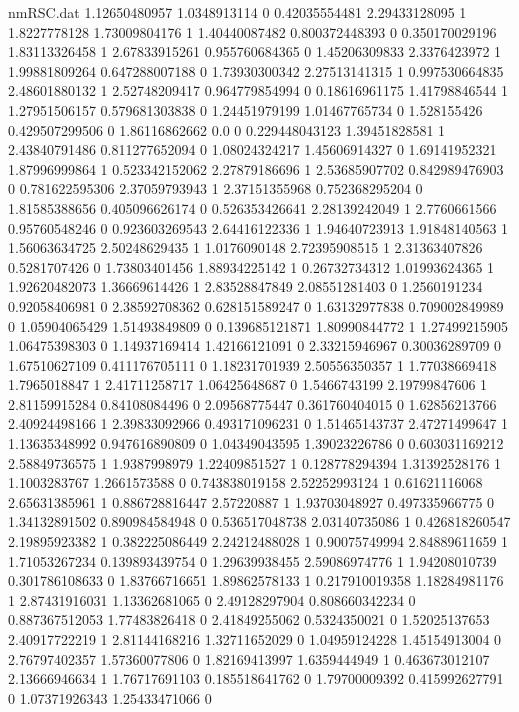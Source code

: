 \begin{filecontents}{nmRSC.dat}
1.12650480957 1.0348913114 0
0.42035554481 2.29433128095 1
1.8227778128 1.73009804176 1
1.40440087482 0.800372448393 0
0.350170029196 1.83113326458 1
2.67833915261 0.955760684365 0
1.45206309833 2.3376423972 1
1.99881809264 0.647288007188 0
1.73930300342 2.27513141315 1
0.997530664835 2.48601880132 1
2.52748209417 0.964779854994 0
0.18616961175 1.41798846544 1
1.27951506157 0.579681303838 0
1.24451979199 1.01467765734 0
1.528155426 0.429507299506 0
1.86116862662 0.0 0
0.229448043123 1.39451828581 1
2.43840791486 0.811277652094 0
1.08024324217 1.45606914327 0
1.69141952321 1.87996999864 1
0.523342152062 2.27879186696 1
2.53685907702 0.842989476903 0
0.781622595306 2.37059793943 1
2.37151355968 0.752368295204 0
1.81585388656 0.405096626174 0
0.526353426641 2.28139242049 1
2.7760661566 0.95760548246 0
0.923603269543 2.64416122336 1
1.94640723913 1.91848140563 1
1.56063634725 2.50248629435 1
1.0176090148 2.72395908515 1
2.31363407826 0.5281707426 0
1.73803401456 1.88934225142 1
0.26732734312 1.01993624365 1
1.92620482073 1.36669614426 1
2.83528847849 2.08551281403 0
1.2560191234 0.92058406981 0
2.38592708362 0.628151589247 0
1.63132977838 0.709002849989 0
1.05904065429 1.51493849809 0
0.139685121871 1.80990844772 1
1.27499215905 1.06475398303 0
1.14937169414 1.42166121091 0
2.33215946967 0.30036289709 0
1.67510627109 0.411176705111 0
1.18231701939 2.50556350357 1
1.77038669418 1.7965018847 1
2.41711258717 1.06425648687 0
1.5466743199 2.19799847606 1
2.81159915284 0.84108084496 0
2.09568775447 0.361760404015 0
1.62856213766 2.40924498166 1
2.39833092966 0.493171096231 0
1.51465143737 2.47271499647 1
1.13635348992 0.947616890809 0
1.04349043595 1.39023226786 0
0.603031169212 2.58849736575 1
1.9387998979 1.22409851527 1
0.128778294394 1.31392528176 1
1.1003283767 1.2661573588 0
0.743838019158 2.52252993124 1
0.61621116068 2.65631385961 1
0.886728816447 2.57220887 1
1.93703048927 0.497335966775 0
1.34132891502 0.890984584948 0
0.536517048738 2.03140735086 1
0.426818260547 2.19895923382 1
0.382225086449 2.24212488028 1
0.90075749994 2.84889611659 1
1.71053267234 0.139893439754 0
1.29639938455 2.59086974776 1
1.94208010739 0.301786108633 0
1.83766716651 1.89862578133 1
0.217910019358 1.18284981176 1
2.87431916031 1.13362681065 0
2.49128297904 0.808660342234 0
0.887367512053 1.77483826418 0
2.41849255062 0.5324350021 0
1.52025137653 2.40917722219 1
2.81144168216 1.32711652029 0
1.04959124228 1.45154913004 0
2.76797402357 1.57360077806 0
1.82169413997 1.6359444949 1
0.463673012107 2.13666946634 1
1.76717691103 0.185518641762 0
1.79700009392 0.415992627791 0
1.07371926343 1.25433471066 0

\end{filecontents}
